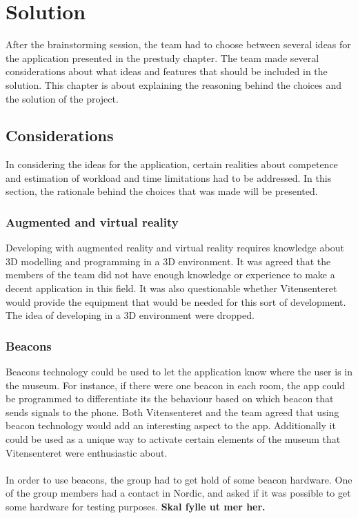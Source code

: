 \chapter{Solution}
After the brainstorming session, the team had to choose between several ideas for the application presented in the prestudy chapter. The team made several considerations about what ideas and features that should be included in the solution. This chapter is about explaining the reasoning behind the choices and the solution of the project.

\section{Considerations}
In considering the ideas for the application, certain realities about competence and estimation of workload and time limitations had to be addressed. In this section, the rationale behind the choices that was made will be presented. 

\subsection{Augmented and virtual reality}
Developing with augmented reality and virtual reality requires knowledge about 3D modelling and programming in a 3D environment. It was agreed that the members of the team did not have enough knowledge or experience to make a decent application in this field. It was also questionable whether Vitensenteret would provide the equipment that would be needed for this sort of development. The idea of developing in a 3D environment were dropped.

\subsection{Beacons}
Beacons technology could be used to let the application know where the user is in the museum. For instance, if there were one beacon in each room, the app could be programmed to differentiate its the behaviour based on which beacon that sends signals to the phone. Both Vitensenteret and the team agreed that using beacon technology would add an interesting aspect to the app. Additionally it could be used as a unique way to activate certain elements of the museum that Vitensenteret were enthusiastic about. \\
\\
In order to use beacons, the group had to get hold of some beacon hardware. One of the group members had a contact in Nordic, and asked if it was possible to get some hardware for testing purposes.\textbf{ Skal fylle ut mer her. }

